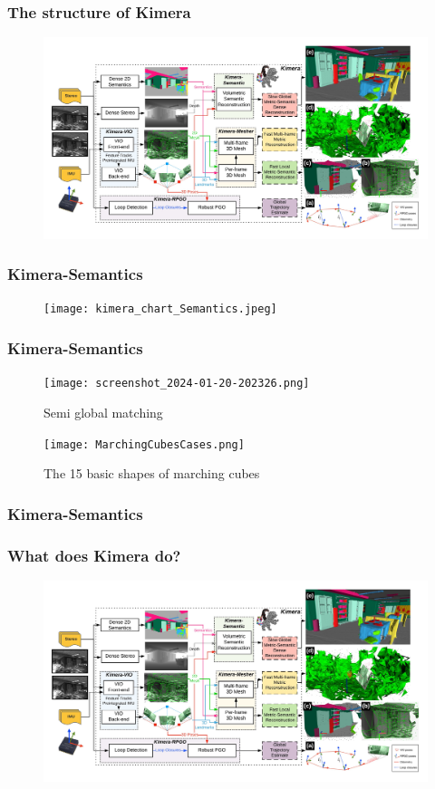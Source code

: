 \documentclass[11pt]{beamer}
\begin{document}
\begin{frame}
\frametitle{The structure of Kimera}
\begin{figure}
    \includegraphics[width=\linewidth]{kimera_chart_23.jpeg} 
\end{figure}
\end{frame}
\begin{frame}
\frametitle{Kimera-Semantics}
\begin{figure}
    \texttt{[image: kimera\_chart\_Semantics.jpeg]} 
\end{figure}
\end{frame}
\begin{frame}
\frametitle{Kimera-Semantics}
\begin{figure}
    \texttt{[image: screenshot\_2024-01-20-202326.png]} 
    \caption{Semi global matching \cite{SGM}}
\end{figure}
\begin{figure}
    \texttt{[image: MarchingCubesCases.png]} 
    \caption{The 15 basic shapes of marching cubes \cite{marchingCubesImage} }
\end{figure}
\end{frame}
\begin{frame}
\frametitle{Kimera-Semantics}
    \begin{figure}[ht]
        \centering
    \end{figure}
\end{frame}
\begin{frame}
\frametitle{What does Kimera do?}
\begin{figure}
    \includegraphics[width=\linewidth]{kimera_chart_23.jpeg} 
\end{figure}
\end{frame}
\end{document}
